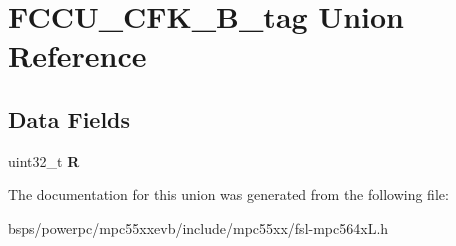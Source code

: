 \hypertarget{unionFCCU__CFK__32B__tag}{}\section{F\+C\+C\+U\+\_\+\+C\+F\+K\+\_\+B\+\_\+tag Union Reference}
\label{unionFCCU__CFK__32B__tag}
\subsection*{Data Fields}
\begin{DoxyCompactItemize}
\item 
\mbox{\label{unionFCCU__CFK__32B__tag_abaaf1272565f00acd5643cdbb0b86cb1}} 
uint32\+\_\+t {\bfseries R}
\end{DoxyCompactItemize}


The documentation for this union was generated from the following file\+:\begin{DoxyCompactItemize}
\item 
bsps/powerpc/mpc55xxevb/include/mpc55xx/fsl-\/mpc564x\+L.\+h\end{DoxyCompactItemize}
